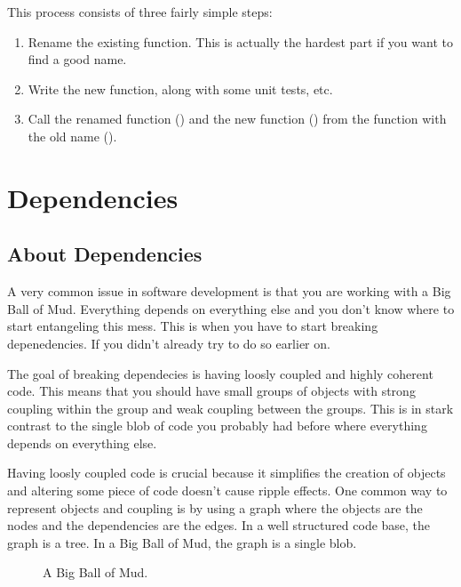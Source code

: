 This process consists of three fairly simple steps:
\begin{enumerate}
    \item Rename the existing function. This is actually the hardest part if you want to find a good name.
    \item Write the new function, along with some unit tests, etc.
    \item Call the renamed function () and the new function \newline() from the function with the old name ().
\end{enumerate}

\chapter{Dependencies}

\section{About Dependencies}

A very common issue in software development is that you are working with a Big Ball of Mud. Everything depends on everything else and you don't know where to start entangeling this mess. This is when you have to start breaking depenedencies. If you didn't already try to do so earlier on.

The goal of breaking dependecies is having loosly coupled and highly coherent code. This means that you should have small groups of objects with strong coupling within the group and weak coupling between the groups. This is in stark contrast to the single blob of code you probably had before where everything depends on everything else.

Having loosly coupled code is crucial because it simplifies the creation of objects and altering some piece of code doesn't cause ripple effects. One common way to represent objects and coupling is by using a graph where the objects are the nodes and the dependencies are the edges. In a well structured code base, the graph is a tree. In a Big Ball of Mud, the graph is a single blob.


\begin{figure}[h]
    \centering
    \caption{A Big Ball of Mud.}
    \label{fig:big_ball_of_mud}
\end{figure}

